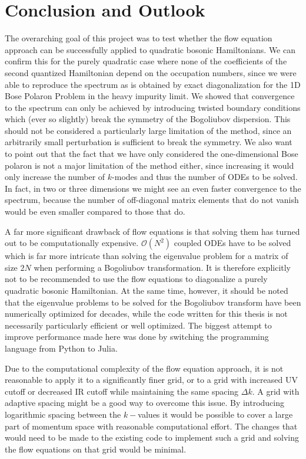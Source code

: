 \chapter{Conclusion and Outlook}\label{Conclusion and Outlook}
The overarching goal of this project was to test whether the flow equation approach can be successfully applied to quadratic bosonic Hamiltonians. We can confirm this for the purely quadratic case where none of the coefficients of the second quantized Hamiltonian depend on the occupation numbers, since we were able to reproduce the spectrum as is obtained by exact diagonalization for the 1D Bose Polaron Problem in the heavy impurity limit. We showed that convergence to the spectrum can only be achieved by introducing twisted boundary conditions which (ever so slightly) break the symmetry of the Bogoliubov dispersion. This should not be considered a particularly large limitation of the method, since an arbitrarily small perturbation is sufficient to break the symmetry. We also want to point out that the fact that we have only considered the one-dimensional Bose polaron is not a major limitation of the method either, since increasing it would only increase the number of $k$-modes and thus the number of ODEs to be solved. In fact, in two or three dimensions we might see an even faster convergence to the spectrum, because the number of off-diagonal matrix elements that do not vanish would be even smaller compared to those that do.\par
A far more significant drawback of flow equations is that solving them has turned out to be computationally expensive. $\mathcal O(N^2)$ coupled ODEs have to be solved which is far more intricate than solving the eigenvalue problem for a matrix of size $2N$ when performing a Bogoliubov transformation. It is therefore explicitly not to be recommended to use the flow equations to diagonalize a purely quadratic bosonic Hamiltonian. At the same time, however, it should be noted that the eigenvalue problems to be solved for the Bogoliubov transform have been numerically optimized for decades, while the code written for this thesis is not necessarily particularly efficient or well optimized. The biggest attempt to improve performance made here was done by switching the programming language from Python to Julia.\par
Due to the computational complexity of the flow equation approach, it is not reasonable to apply it to a significantly finer grid, or to a grid with increased UV cutoff or decreased IR cutoff while maintaining the same spacing $\Delta k$. A grid with adaptive spacing might be a good way to overcome this issue. By introducing logarithmic spacing between the $k-$values it would be possible to cover a large part of momentum space with reasonable computational effort. The changes that would need to be made to the existing code to implement such a grid and solving the flow equations on that grid would be minimal.   \par
